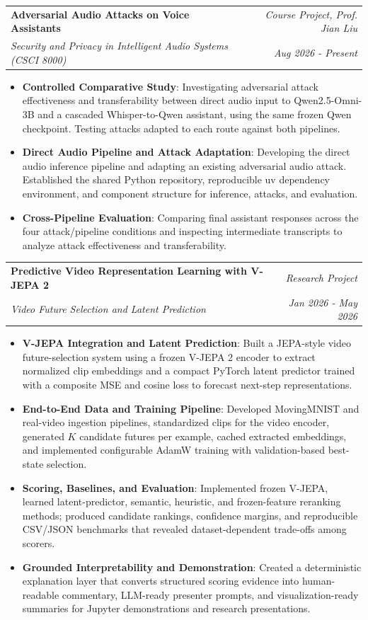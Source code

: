 \documentclass[a4paper,10pt]{article}
\makeatletter
\newcommand{\resumeSubheading}[4]{
  \Needspace{10\baselineskip}
  \item
    \begin{tabular*}{0.97\textwidth}{l@{\extracolsep{\fill}}r}
      \textbf{#1} & \textit{#2} \\
      \textit{\small#3} & \textit{\small#4} \\
    \end{tabular*}
}
\newcommand{\resumeItem}[2]{\item \small{\textbf{#1}{: #2 \vspace{-2pt}}}}
\newcommand{\resumeItemListStart}{\begin{itemize}}
\newcommand{\resumeItemListEnd}{\end{itemize}}
\makeatother
\begin{document}
    \resumeSubheading
        {Adversarial Audio Attacks on Voice Assistants}{Course Project, Prof. Jian Liu}
        {Security and Privacy in Intelligent Audio Systems (CSCI 8000)}{Aug 2026 - Present}
        \resumeItemListStart
            \resumeItem{Controlled Comparative Study}
                {Investigating adversarial attack effectiveness and transferability between direct audio input to Qwen2.5-Omni-3B and a cascaded Whisper-to-Qwen assistant, using the same frozen Qwen checkpoint. Testing attacks adapted to each route against both pipelines.}
            \resumeItem{Direct Audio Pipeline and Attack Adaptation}
                {Developing the direct audio inference pipeline and adapting an existing adversarial audio attack. Established the shared Python repository, reproducible uv dependency environment, and component structure for inference, attacks, and evaluation.}
            \resumeItem{Cross-Pipeline Evaluation}
                {Comparing final assistant responses across the four attack/pipeline conditions and inspecting intermediate transcripts to analyze attack effectiveness and transferability.}
        \resumeItemListEnd

    \resumeSubheading
        {Predictive Video Representation Learning with V-JEPA 2}{Research Project}
        {Video Future Selection and Latent Prediction}{Jan 2026 - May 2026}
        \resumeItemListStart
            \resumeItem{V-JEPA Integration and Latent Prediction}
                {Built a JEPA-style video future-selection system using a frozen V-JEPA 2 encoder to extract normalized clip embeddings and a compact PyTorch latent predictor trained with a composite MSE and cosine loss to forecast next-step representations.}
            \resumeItem{End-to-End Data and Training Pipeline}
                {Developed MovingMNIST and real-video ingestion pipelines, standardized clips for the video encoder, generated $K$ candidate futures per example, cached extracted embeddings, and implemented configurable AdamW training with validation-based best-state selection.}
            \resumeItem{Scoring, Baselines, and Evaluation}
                {Implemented frozen V-JEPA, learned latent-predictor, semantic, heuristic, and frozen-feature reranking methods; produced candidate rankings, confidence margins, and reproducible CSV/JSON benchmarks that revealed dataset-dependent trade-offs among scorers.}
            \resumeItem{Grounded Interpretability and Demonstration}
                {Created a deterministic explanation layer that converts structured scoring evidence into human-readable commentary, LLM-ready presenter prompts, and visualization-ready summaries for Jupyter demonstrations and research presentations.}
        \resumeItemListEnd
\end{document}

